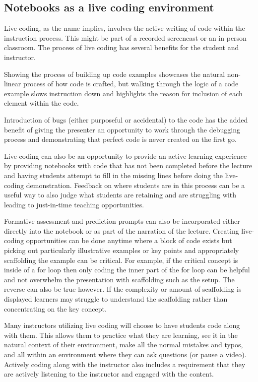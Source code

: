 \documentclass[]{book}
\begin{document}
\subsection{Notebooks as a live coding
environment}\label{notebooks-as-a-live-coding-environment}

Live coding, as the name implies, involves the active writing of code
within the instruction process. This might be part of a recorded
screencast or an in person classroom. The process of live coding has
several benefits for the student and instructor.

Showing the process of building up code examples showcases the natural
non-linear process of how code is crafted, but walking through the logic
of a code example slows instruction down and highlights the reason for
inclusion of each element within the code.

Introduction of bugs (either purposeful or accidental) to the code has
the added benefit of giving the presenter an opportunity to work through
the debugging process and demonstrating that perfect code is never
created on the first go.

Live-coding can also be an opportunity to provide an active learning
experience by providing notebooks with code that has not been completed
before the lecture and having students attempt to fill in the missing
lines before doing the live-coding demonstration. Feedback on where
students are in this process can be a useful way to also judge what
students are retaining and are struggling with leading to just-in-time
teaching opportunities.

Formative assessment and prediction prompts can also be incorporated
either directly into the notebook or as part of the narration of the
lecture. Creating live-coding opportunities can be done anytime where a
block of code exists but picking out particularly illustrative examples
or key points and appropriately scaffolding the example can be critical.
For example, if the critical concept is inside of a for loop then only
coding the inner part of the for loop can be helpful and not overwhelm
the presentation with scaffolding such as the setup. The reverse can
also be true however. If the complexity or amount of scaffolding is
displayed learners may struggle to understand the scaffolding rather
than concentrating on the key concept.

Many instructors utilizing live coding will choose to have students code
along with them. This allows them to practice what they are learning,
see it in the natural context of their environment, make all the normal
mistakes and typos, and all within an environment where they can ask
questions (or pause a video). Actively coding along with the instructor
also includes a requirement that they are actively listening to the
instructor and engaged with the content.
\end{document}

